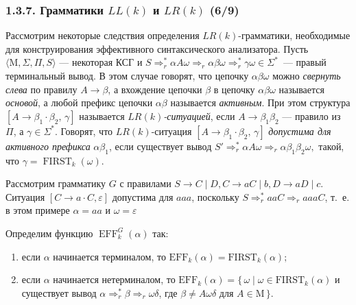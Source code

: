 \documentclass[mathserif,12pt,aspectratio=169]{beamer}
\renewcommand{\index}[1]{}
\def\odmkey#1#2{{\it\color{red} #1}\index{#2}}
\begin{document}
\begin{frame}
\frametitle{1.3.7. Грамматики $LL(k)$ и $LR(k)$ (6/9)}
Рассмотрим некоторые следствия определения 
$LR(k)$-грамматики, необходимые для конструирования
эффективного синтаксического анализатора.
Пусть $\langle \mathrm{M}, \Sigma, \Pi, S \rangle$ --- некоторая КСГ и
$S\Rightarrow^*_r \alpha A \omega \Rightarrow_r \alpha \beta \omega
\Rightarrow_r^*\gamma\omega \in \Sigma^*$~---
правый терминальный вывод.
В этом случае говорят, что цепочку $\alpha \beta \omega$ 
можно \odmkey{свернуть слева}{Свёртка!слева} по правилу
$A\to\beta$, а вхождение цепочки $\beta$ в цепочку 
$\alpha \beta \omega$ называется \odmkey{основой}{Основа},
а любой префикс цепочки $\alpha\beta$ называется 
\odmkey{активным}{Префикс!активный}.
При этом структура
\(
[A \to \beta_1 \cdot \beta_2,\, \gamma]
\)
называется \odmkey{$LR(k)$-ситуацией}{Ситуация!$LR(k)$},  
если $A \to \beta_1 \beta_2$ --- правило из $\Pi$, 
а $\gamma \in \Sigma^{*}$. 
Говорят, что $LR(k)$-ситуация $[A \to \beta_1 \cdot \beta_2,\, \gamma]$ 
\odmkey{допустима для активного префикса}{Ситуация!Допустимая} $\alpha \beta_1$, если существует вывод
\(
S' \Rightarrow_r^* \alpha A \omega \Rightarrow_r \alpha \beta_1 \beta_2 \omega,
\)
такой, что $\gamma = \operatorname{FIRST}_k(\omega)$.    
\begin{example}
    Рассмотрим грамматику \(G\) с правилами 
    \(S \to C \mid D, C \to aC \mid b, D \to aD\mid c\). 
    Ситуация \([C \to a \cdot C, \varepsilon]\) допустима для \(aaa\), 
    поскольку \(S \Rightarrow_r^* aaC \Rightarrow_r aaaC\), 
    т.~е. в этом примере 
    \(\alpha = aa\) и \(\omega = \varepsilon\)
\end{example} 

\smallskip
Определим функцию $\operatorname{EFF}_k^G(\alpha)$ так:
\begin{enumerate}
    \item если $\alpha$ начинается терминалом, то
    \(
        \mathrm{EFF}_k(\alpha) = \mathrm{FIRST}_k(\alpha);
    \)
    \item если $\alpha$ начинается нетерминалом, то
    \(
        \mathrm{EFF}_k(\alpha) = 
        \{\, \omega \mid 
        \omega \in \mathrm{FIRST}_k(\alpha)\) 
         и существует вывод 
        $\alpha \Rightarrow_r^* \beta \Rightarrow_r \omega \delta$,
        где  $\beta \neq A \omega \delta$  для $ A \in \mathrm{M} \,\}$.
\end{enumerate}

\end{frame}
\end{document}
